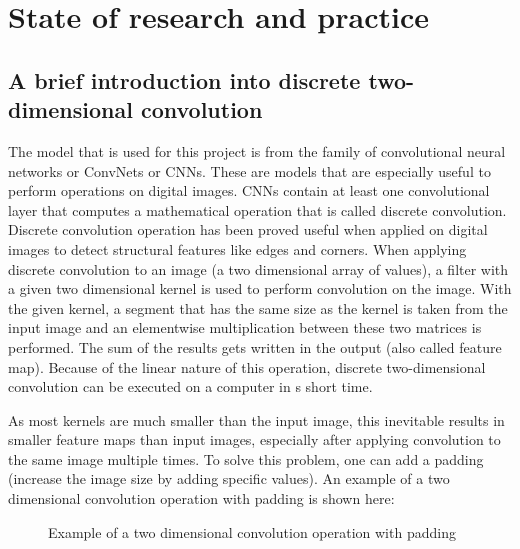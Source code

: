 \chapter{State of research and practice}
\label{ch:state}

\section{A brief introduction into discrete two-dimensional convolution}

The model that is used for this project is from the family of convolutional neural networks or ConvNets or CNNs. These are models that are especially useful to perform operations on digital images. CNNs contain at least one convolutional layer that computes a mathematical operation that is called discrete convolution. Discrete convolution operation has been proved useful when applied on digital images to detect structural features like edges and corners. When applying discrete convolution to an image (a two dimensional array of values), a filter with a given two dimensional kernel is used to perform convolution on the image. With the given kernel, a segment that has the same size as the kernel is taken from the input image and an elementwise multiplication between these two matrices is performed. The sum of the results gets written in the output (also called feature map). Because of the linear nature of this operation, discrete two-dimensional convolution can be executed on a computer in s short time.

As most kernels are much smaller than the input image, this inevitable results in smaller feature maps than input images, especially after applying convolution to the same image multiple times. To solve this problem, one can add a padding (increase the image size by adding specific values). An example of a two dimensional convolution operation with padding is shown here:

\begin{figure}[H]
	\caption{\label{fig:convolution} Example of a two dimensional convolution operation with padding}
\end{figure}

